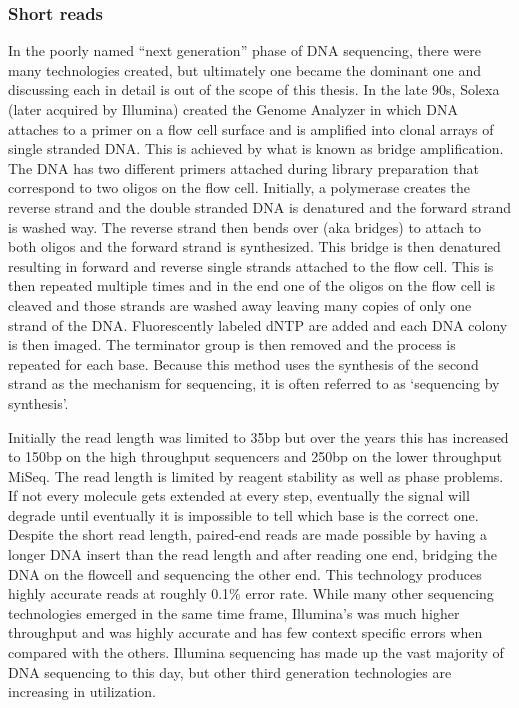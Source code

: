 \subsubsection{Short reads}\label{section:nextgen}

\par{
In the poorly named ``next generation'' phase of DNA sequencing, there were many technologies created, but ultimately one became the dominant one and discussing each in detail is out of the scope of this thesis. In the late 90s, Solexa (later acquired by Illumina) created the Genome Analyzer in which DNA attaches to a primer on a flow cell surface and is amplified into clonal arrays of single stranded DNA\cite{flowcell}. This is achieved by what is known as bridge amplification. The DNA has two different primers attached during library preparation that correspond to two oligos on the flow cell. Initially, a polymerase creates the reverse strand and the double stranded DNA is denatured and the forward strand is washed way. The reverse strand then bends over (aka bridges) to attach to both oligos and the forward strand is synthesized. This bridge is then denatured resulting in forward and reverse single strands attached to the flow cell. This is then repeated multiple times and in the end one of the oligos on the flow cell is cleaved and those strands are washed away leaving many copies of only one strand of the DNA\cite{bridgeamp}. Fluorescently labeled dNTP are added and each DNA colony is then imaged. The terminator group is then removed\cite{reversibleterminator} and the process is repeated for each base. Because this method uses the synthesis of the second strand as the mechanism for sequencing, it is often referred to as `sequencing by synthesis'. 
} 

\par{
Initially the read length was limited to 35bp but over the years this has increased to 150bp on the high throughput sequencers and 250bp on the lower throughput MiSeq. The read length is limited by reagent stability as well as phase problems. If not every molecule gets extended at every step, eventually the signal will degrade until eventually it is impossible to tell which base is the correct one. Despite the short read length, paired-end reads are made possible by having a longer DNA insert than the read length and after reading one end, bridging the DNA on the flowcell and sequencing the other end. This technology produces highly accurate reads at roughly 0.1\% error rate. While many other sequencing technologies emerged in the same time frame, Illumina's was much higher throughput and was highly accurate and has few context specific errors when compared with the others\cite{errormotifs}. Illumina sequencing has made up the vast majority of DNA sequencing to this day, but other third generation technologies are increasing in utilization.
} 


